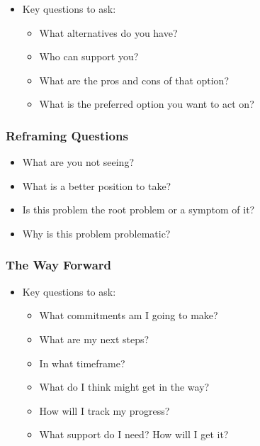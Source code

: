 \documentclass[
]{book}
\providecommand{\tightlist}{%
  \setlength{\itemsep}{0pt}\setlength{\parskip}{0pt}}
\begin{document}
\begin{itemize}
\tightlist
\item
  Key questions to ask:

  \begin{itemize}
  \tightlist
  \item
    What alternatives do you have?
  \item
    Who can support you?
  \item
    What are the pros and cons of that option?
  \item
    What is the preferred option you want to act on?
  \end{itemize}
\end{itemize}

\hypertarget{reframing-questions}{%
\subsubsection*{Reframing Questions}\label{reframing-questions}}

\begin{itemize}
\tightlist
\item
  What are you not seeing?
\item
  What is a better position to take?
\item
  Is this problem the root problem or a symptom of it?
\item
  Why is this problem problematic?
\end{itemize}

\hypertarget{the-way-forward}{%
\subsubsection*{The Way Forward}\label{the-way-forward}}

\begin{itemize}
\tightlist
\item
  Key questions to ask:

  \begin{itemize}
  \tightlist
  \item
    What commitments am I going to make?
  \item
    What are my next steps?
  \item
    In what timeframe?
  \item
    What do I think might get in the way?
  \item
    How will I track my progress?
  \item
    What support do I need? How will I get it?
  \end{itemize}
\end{itemize}
\end{document}
